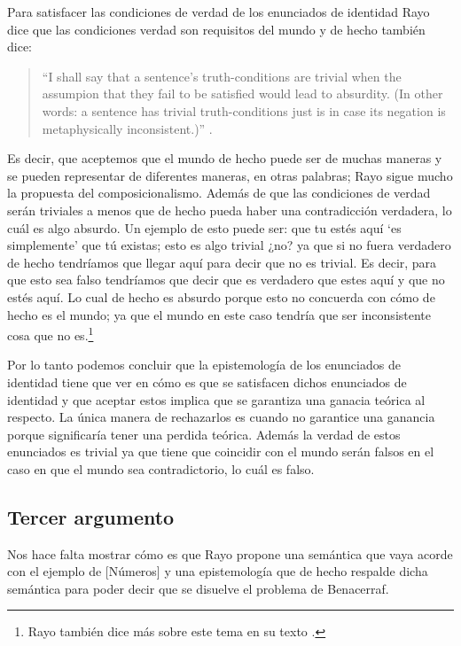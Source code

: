 \documentclass[]{article}
\begin{document}
Para satisfacer las condiciones 
de verdad de los enunciados de identidad Rayo dice que las 
condiciones verdad son requisitos del mundo \cite{rayo2013}
y de hecho también dice: 
\begin{quotation}
    \noindent \small ``I shall say that a sentence’s 
    truth-conditions are trivial when the assumpion that they 
    fail to be satisfied would lead to absurdity. (In other 
    words: a sentence has trivial truth-conditions just is in 
    case its negation is metaphysically 
    inconsistent.)'' \cite{rayo2013construction}. 
\end{quotation}
Es decir, que aceptemos que el mundo de hecho puede ser de 
muchas maneras y se pueden representar de diferentes
maneras, en otras palabras; Rayo sigue mucho la propuesta del 
composicionalismo. Además de que las condiciones de verdad 
serán triviales a menos que de hecho pueda haber una contradicción 
verdadera, lo cuál es algo absurdo. Un ejemplo de esto 
puede ser: que tu est\'es aquí `es simplemente' que tú existas;
esto es algo trivial ¿no? ya que si no fuera verdadero de hecho 
tendríamos que llegar aquí para decir que no es trivial. Es
decir, para que esto sea falso tendríamos que decir que es
verdadero que estes aquí y que no est\'es aquí. Lo cual de hecho 
es absurdo porque esto no concuerda con c\'omo de hecho es el 
mundo; ya que el mundo en este caso tendría que ser inconsistente 
cosa que no es.\footnote{Rayo también dice 
más sobre este tema en su texto \cite{rayo2008specifying}.}

Por lo tanto podemos concluir que la epistemología de los 
enunciados de identidad tiene que ver en c\'omo 
es que se satisfacen dichos enunciados de identidad y que 
aceptar estos implica que se garantiza una ganacia teórica 
al respecto. La \'unica manera de rechazarlos es cuando no 
garantice una ganancia porque significaría tener una perdida 
teórica. Además la verdad de estos enunciados es trivial 
ya que tiene que coincidir con el mundo serán falsos en el
caso en que el mundo sea contradictorio, lo cuál es falso.

\subsection*{\small Tercer argumento}
Nos hace falta mostrar c\'omo es que Rayo propone 
una semántica que vaya acorde con el ejemplo de [Números] 
y una epistemología que de hecho respalde dicha semántica para 
poder decir que se disuelve el problema de Benacerraf. 
\end{document}
